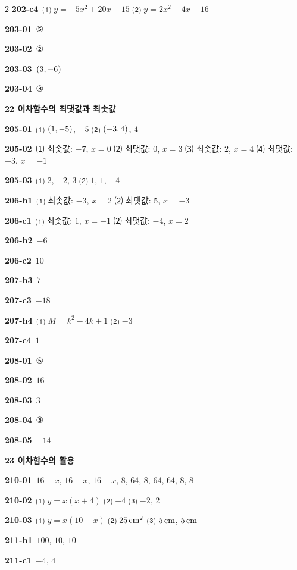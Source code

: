 \documentclass[10pt,a4paper]{article}
\begin{document}
\begin{multicols}{2}
\noindent\textbf{202-c4}\ ⑴ $y=-5x^2+20x-15$ ⑵ $y=2x^2-4x-16$\par
\noindent\textbf{203-01}\ ⑤\par
\noindent\textbf{203-02}\ ②\par
\noindent\textbf{203-03}\ $(3{,}\mkern3mu\mathopen{}-6)$\par
\noindent\textbf{203-04}\ ③\par
\noindent\textbf{22 이차함수의 최댓값과 최솟값}\par\smallskip
\noindent\textbf{205-01}\ ⑴ $(1{,}\mkern3mu\mathopen{}-5)$, $-5$ ⑵ $(-3{,}\mkern3mu\mathopen{}4)$, $4$\par
\noindent\textbf{205-02}\ ⑴ 최솟값: $-7$, $x=0$ ⑵ 최댓값: $0$, $x=3$ ⑶ 최솟값: $2$, $x=4$ ⑷ 최댓값: $-3$, $x=-1$\par
\noindent\textbf{205-03}\ ⑴ $2$, $-2$, $3$ ⑵ $1$, $1$, $-4$\par
\noindent\textbf{206-h1}\ ⑴ 최솟값: $-3$, $x=2$ ⑵ 최댓값: $5$, $x=-3$\par
\noindent\textbf{206-c1}\ ⑴ 최솟값: $1$, $x=-1$ ⑵ 최댓값: $-4$, $x=2$\par
\noindent\textbf{206-h2}\ $-6$\par
\noindent\textbf{206-c2}\ $10$\par
\noindent\textbf{207-h3}\ $7$\par
\noindent\textbf{207-c3}\ $-18$\par
\noindent\textbf{207-h4}\ ⑴ $M=k^2-4k+1$ ⑵ $-3$\par
\noindent\textbf{207-c4}\ $1$\par
\noindent\textbf{208-01}\ ⑤\par
\noindent\textbf{208-02}\ $16$\par
\noindent\textbf{208-03}\ $3$\par
\noindent\textbf{208-04}\ ③\par
\noindent\textbf{208-05}\ $-14$\par
\noindent\textbf{23 이차함수의 활용}\par\smallskip
\noindent\textbf{210-01}\ $16-x$, $16-x$, $16-x$, $8$, $64$, $8$, $64$, $64$, $8$, $8$\par
\noindent\textbf{210-02}\ ⑴ $y=x(x+4)$ ⑵ $-4$ ⑶ $-2$, $2$\par
\noindent\textbf{210-03}\ ⑴ $y=x(10-x)$ ⑵ $25\mkern3mu \mathrm{cm}^2$ ⑶ $5\mkern3mu \mathrm{cm}$, $5\mkern3mu \mathrm{cm}$\par
\noindent\textbf{211-h1}\ $100$, $10$, $10$\par
\noindent\textbf{211-c1}\ $-4$, $4$\par

\end{multicols}
\end{document}
